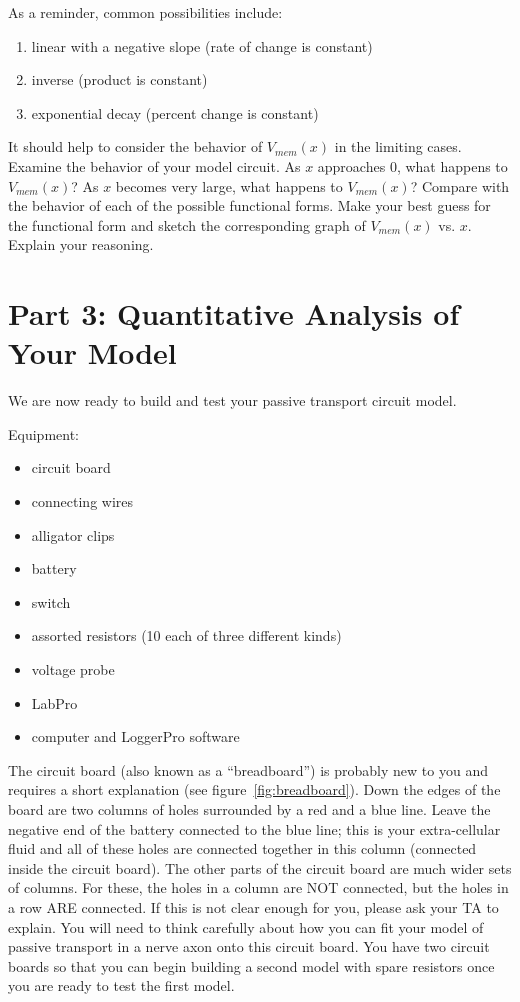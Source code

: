 As a reminder, common possibilities include:
\begin{enumerate}
\itemsep-0.2em
\item linear with a negative slope (rate of change is constant)
\item inverse (product is constant)
\item exponential decay (percent change is constant)
\end{enumerate}
It should help to consider the behavior of $V_{mem}(x)$ in the limiting cases.
Examine the behavior of your model circuit.
As $x$ approaches $0$, what happens to $V_{mem}(x)$?
As $x$ becomes very large, what happens to $V_{mem}(x)$?
Compare with the behavior of each of the possible functional forms.
Make your best guess for the functional form and sketch the corresponding graph of $V_{mem}(x)$ vs. $x$.
Explain your reasoning.

\section*{Part 3: Quantitative Analysis of Your Model}
We are now ready to build and test your passive transport circuit model.
\par 
Equipment:
\begin{itemize}
	\itemsep-0.2em
	\item circuit board
	\item connecting wires
	\item alligator clips
	\item battery 
	\item switch
	\item assorted resistors (10 each of three different kinds)
	\item voltage probe
	\item LabPro
	\item computer and LoggerPro software
\end{itemize}
The circuit board (also known as a ``breadboard'') is probably new to you and requires a short explanation (see figure~\ref{fig:breadboard}).
Down the edges of the board are two columns of holes surrounded by a red and a blue line.
Leave the negative end of the battery connected to the blue line; this is your extra-cellular fluid and all of these holes are connected together in this column (connected inside the circuit board).
The other parts of the circuit board are much wider sets of columns.
For these, the holes in a column are NOT connected, but the holes in a row ARE connected.
If this is not clear enough for you, please ask your TA to explain.
You will need to think carefully about how you can fit your model of passive transport in a nerve axon onto this circuit board.
You have two circuit boards so that you can begin building a second model with spare resistors once you are ready to test the first model.
\par 

